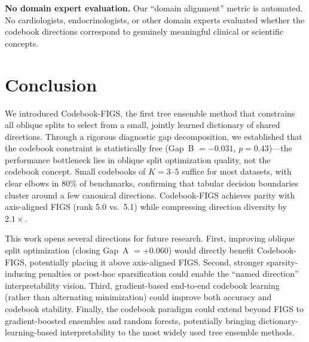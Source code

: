 \documentclass[11pt,letterpaper]{article}
\begin{document}
\textbf{No domain expert evaluation.} Our ``domain alignment'' metric is automated. No cardiologists, endocrinologists, or other domain experts evaluated whether the codebook directions correspond to genuinely meaningful clinical or scientific concepts.

\section{Conclusion}

We introduced Codebook-FIGS, the first tree ensemble method that constrains all oblique splits to select from a small, jointly learned dictionary of shared directions. Through a rigorous diagnostic gap decomposition, we established that the codebook constraint is statistically free (Gap~B $= -0.031$, $p = 0.43$)---the performance bottleneck lies in oblique split optimization quality, not the codebook concept. Small codebooks of $K = 3$--$5$ suffice for most datasets, with clear elbows in 80\% of benchmarks, confirming that tabular decision boundaries cluster around a few canonical directions. Codebook-FIGS achieves parity with axis-aligned FIGS (rank 5.0 vs.\ 5.1) while compressing direction diversity by $2.1\times$.

This work opens several directions for future research. First, improving oblique split optimization (closing Gap~A $= +0.060$) would directly benefit Codebook-FIGS, potentially placing it above axis-aligned FIGS. Second, stronger sparsity-inducing penalties or post-hoc sparsification could enable the ``named direction'' interpretability vision. Third, gradient-based end-to-end codebook learning (rather than alternating minimization) could improve both accuracy and codebook stability. Finally, the codebook paradigm could extend beyond FIGS to gradient-boosted ensembles and random forests, potentially bringing dictionary-learning-based interpretability to the most widely used tree ensemble methods.



\end{document}

